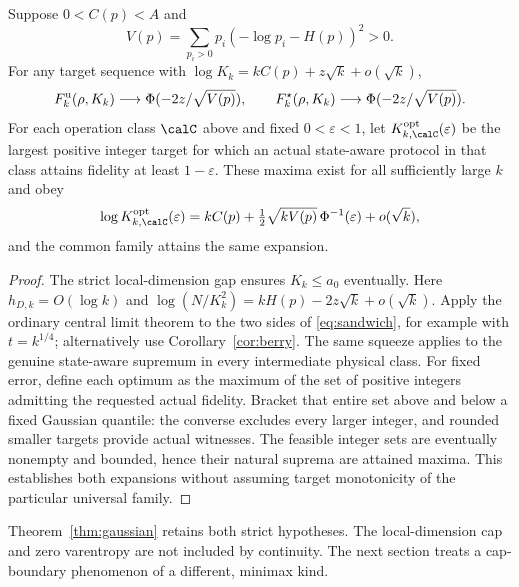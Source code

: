 \begin{theorem}\label{thm:gaussian}
Suppose $0<C(p)<A$ and
\[
 V(p)=\sum_{p_i>0}p_i(-\log p_i-H(p))^2>0.
\]
For any target sequence with $\log K_k=kC(p)+z\sqrt k+o(\sqrt k)$,
\begin{equation}\label{eq:gaussian-limit}
 F_k^{\rm u}(\rho,K_k)\longrightarrow\Phi(-2z/\sqrt{V(p)}),\qquad
 F_k^\star(\rho,K_k)\longrightarrow\Phi(-2z/\sqrt{V(p)}).
\end{equation}
For each operation class $\calC$ above and fixed $0<\varepsilon<1$, let $K_{k,\calC}^{\rm opt}(\varepsilon)$ be the largest positive integer target for which an actual state-aware protocol in that class attains fidelity at least $1-\varepsilon$. These maxima exist for all sufficiently large $k$ and obey
\[
 \log K_{k,\calC}^{\rm opt}(\varepsilon)=kC(p)
 +\tfrac12\sqrt{kV(p)}\,\Phi^{-1}(\varepsilon)+o(\sqrt k),
\]
and the common family attains the same expansion.
\end{theorem}
\begin{proof}
The strict local-dimension gap ensures $K_k\le a_0$ eventually. Here $h_{D,k}=O(\log k)$ and $\log(N/K_k^2)=kH(p)-2z\sqrt k+o(\sqrt k)$. Apply the ordinary central limit theorem to the two sides of \eqref{eq:sandwich}, for example with $t=k^{1/4}$; alternatively use Corollary~\ref{cor:berry}. The same squeeze applies to the genuine state-aware supremum in every intermediate physical class. For fixed error, define each optimum as the maximum of the set of positive integers admitting the requested actual fidelity. Bracket that entire set above and below a fixed Gaussian quantile: the converse excludes every larger integer, and rounded smaller targets provide actual witnesses. The feasible integer sets are eventually nonempty and bounded, hence their natural suprema are attained maxima. This establishes both expansions without assuming target monotonicity of the particular universal family.
\end{proof}

Theorem~\ref{thm:gaussian} retains both strict hypotheses. The local-dimension cap and zero varentropy are not included by continuity. The next section treats a cap-boundary phenomenon of a different, minimax kind.
